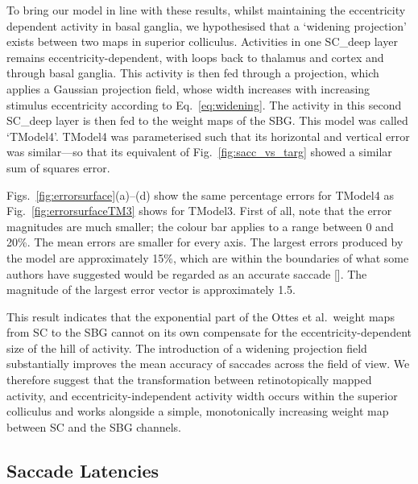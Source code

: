 \documentclass{frontiersSCNS}
\begin{document}
To bring our model in line with these results, whilst maintaining the
eccentricity dependent activity in basal ganglia, we hypothesised
that a `widening projection' exists between two maps in superior
colliculus. Activities in one SC\_deep layer remains eccentricity-dependent,
with loops back to thalamus and cortex and through basal ganglia.
This activity is then fed through a projection, which applies a
Gaussian projection field, whose width increases with increasing
stimulus eccentricity according to Eq.~\ref{eq:widening}.
The activity in this second SC\_deep layer is then fed to the
weight maps of the SBG. This model was called `TModel4'. TModel4
was parameterised such that its horizontal and vertical error
was similar---so that its equivalent of Fig.~\ref{fig:sacc_vs_targ}
showed a similar sum of squares error.

Figs.~\ref{fig:errorsurface}(a)--(d) show the same percentage errors
for TModel4 as Fig.~\ref{fig:errorsurfaceTM3} shows for TModel3.
First of all, note that the error magnitudes are much smaller;
the colour bar applies to a range between 0 and 20\%. The mean
errors are smaller for every axis. The largest errors produced by
the model are approximately 15\%, which are
within the boundaries of what some authors have suggested would be regarded
as an accurate saccade [\cite{mcpeek_saccade_2002,mcpeek_incomplete_2006}].
The magnitude of the largest error vector is approximately 1.5\dg.

This result indicates that the
exponential part of the Ottes et al.~weight maps from SC to the SBG cannot
on its own compensate for the eccentricity-dependent size of the hill of
activity. The introduction of a widening projection field substantially
improves the mean accuracy of saccades across the field of view.
We therefore suggest that the transformation between retinotopically mapped
activity, and eccentricity-independent activity width occurs
within the superior colliculus and works alongside a simple,
monotonically increasing weight map between SC and the SBG channels.


\subsection{Saccade Latencies}
\end{document}
